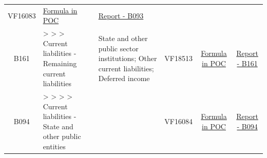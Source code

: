 \documentclass[]{book}
\begin{document}
\begin{longtable}[]{@{}cllccc@{}}
\begin{minipage}[t]{0.09\columnwidth}
VF16083\strut
\end{minipage} & \begin{minipage}[t]{0.15\columnwidth}\centering
\protect\hyperlink{b093---formula-in-poc}{Formula in POC}\strut
\end{minipage} & \begin{minipage}[t]{0.16\columnwidth}\centering
\href{./Auxiliary\%20Files/technical_reports/variable_report/B093(!).pdf}{Report - B093}\strut
\end{minipage}\tabularnewline
\begin{minipage}[t]{0.08\columnwidth}\centering
B161\strut
\end{minipage} & \begin{minipage}[t]{0.20\columnwidth}\raggedright
\textgreater{} \textgreater{} \textgreater{} Current liabilities - Remaining current liabilities\strut
\end{minipage} & \begin{minipage}[t]{0.16\columnwidth}\raggedright
State and other public sector institutions; Other current liabilities; Deferred income\strut
\end{minipage} & \begin{minipage}[t]{0.09\columnwidth}\centering
VF18513\strut
\end{minipage} & \begin{minipage}[t]{0.15\columnwidth}\centering
\protect\hyperlink{b161---formula-in-poc}{Formula in POC}\strut
\end{minipage} & \begin{minipage}[t]{0.16\columnwidth}\centering
\href{./Auxiliary\%20Files/technical_reports/variable_report/B161(!).pdf}{Report - B161}\strut
\end{minipage}\tabularnewline
\begin{minipage}[t]{0.08\columnwidth}\centering
B094\strut
\end{minipage} & \begin{minipage}[t]{0.20\columnwidth}\raggedright
\textgreater{} \textgreater{} \textgreater{} \textgreater{} Current liabilities - State and other public entities\strut
\end{minipage} & \begin{minipage}[t]{0.16\columnwidth}\raggedright
\strut
\end{minipage} & \begin{minipage}[t]{0.09\columnwidth}\centering
VF16084\strut
\end{minipage} & \begin{minipage}[t]{0.15\columnwidth}\centering
\protect\hyperlink{b094---formula-in-poc}{Formula in POC}\strut
\end{minipage} & \begin{minipage}[t]{0.16\columnwidth}\centering
\href{./Auxiliary\%20Files/technical_reports/variable_report/B094(!).pdf}{Report - B094}\strut
\end{minipage}\tabularnewline
\bottomrule
\end{longtable}
\end{document}
